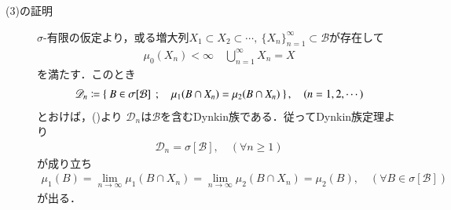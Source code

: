 \begin{prf}
\begin{description}
				\item[(3)の証明]
					$\sigma$-有限の仮定より，或る増大列$X_1 \subset X_2 \subset \cdots
					,\ \{X_n\}_{n=1}^\infty \subset \mathcal{B}$が存在して
					\begin{align}
						\mu_0 (X_n) < \infty \quad \bigcup_{n=1}^\infty X_n = X
						\label{eq:appendix_finite_additive_measure_expansion_3}
					\end{align}
					を満たす．このとき
					\begin{align}
						\mathscr{D}_n \coloneqq \left\{\ B \in \sigma[\mathcal{B}]\ \, ; \quad \mu_1(B \cap X_n) = \mu_2(B \cap X_n)\ \right\},
						\quad (n=1,2,\cdots)
					\end{align}
					とおけば，()より
					$\mathscr{D}_n$は$\mathcal{B}$を含むDynkin族である．従ってDynkin族定理より
					\begin{align}
						\mathscr{D}_n = \sigma[\mathcal{B}],
						\quad (\forall n \geq 1)
					\end{align}
					が成り立ち
					\begin{align}
						\mu_1(B) = \lim_{n \to \infty} \mu_1(B \cap X_n)
						= \lim_{n \to \infty} \mu_2(B \cap X_n) = \mu_2(B),
						\quad (\forall B \in \sigma[\mathcal{B}])
					\end{align}
					が出る．
					

\end{description}
\end{prf}
